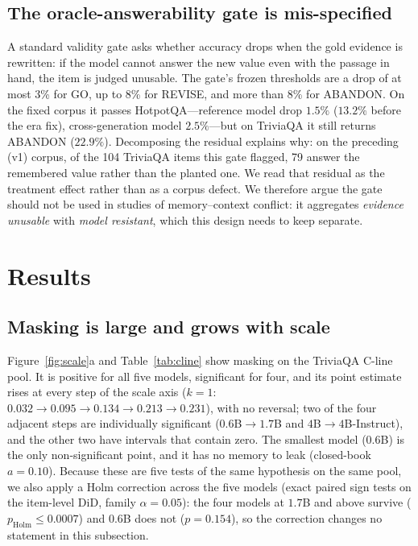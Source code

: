 \documentclass[11pt]{article}
\begin{document}
\subsection{The oracle-answerability gate is mis-specified}\label{sec:gate3}
A standard validity gate asks whether accuracy drops when the gold evidence is rewritten:
if the model cannot answer the new value even with the passage in hand, the item is judged
unusable. The gate's frozen thresholds are a drop of at most 3\% for GO, up to 8\% for
REVISE, and more than 8\% for ABANDON. On the fixed corpus it passes HotpotQA---reference
model drop $1.5\%$ ($13.2\%$ before the era fix), cross-generation model $2.5\%$---but on
TriviaQA it still returns ABANDON ($22.9\%$).
Decomposing the residual explains why: on the preceding (v1) corpus, of the 104 TriviaQA
items this gate flagged, 79 answer the remembered value rather than the planted one. We read
that residual as the treatment effect rather than as a corpus defect. We therefore argue
the gate should not be used in studies of memory--context
conflict: it aggregates \emph{evidence unusable} with \emph{model resistant}, which this
design needs to keep separate.

\section{Results}

\subsection{Masking is large and grows with scale}
Figure~\ref{fig:scale}a and Table~\ref{tab:cline} show masking on the TriviaQA C-line pool.
It is positive for all five models, significant for four, and its point estimate rises at
every step of the scale axis ($k{=}1$: $0.032 \to 0.095 \to 0.134 \to 0.213 \to 0.231$),
with no reversal; two of the four adjacent steps are individually significant
($0.6$B$\to1.7$B and $4$B$\to4$B-Instruct), and the other two have intervals that contain
zero. The smallest model (0.6B) is the only non-significant
point, and it has no memory to leak (closed-book $a{=}0.10$). Because these are five tests of
the same hypothesis on the same pool, we also apply a Holm correction across the five models
(exact paired sign tests on the item-level DiD, family $\alpha{=}0.05$): the four models at
$1.7$B and above survive ($p_{\mathrm{Holm}} \le 0.0007$) and 0.6B does not ($p{=}0.154$),
so the correction changes no statement in this subsection.
\end{document}
